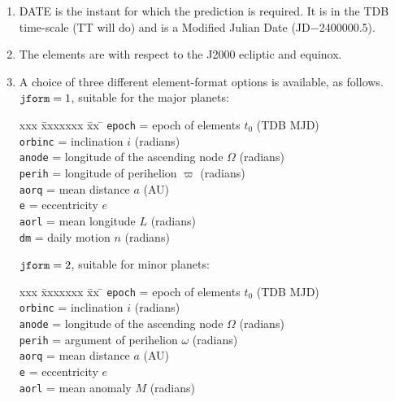 \documentclass[11pt,fleqn,twoside]{article}
\renewcommand{\_}{{\tt\char'137}}     %
\begin{document}
{
 \begin{enumerate}
  \item DATE is the instant for which the prediction is required.  It is
        in the TDB time-scale (TT will do) and is a
        Modified Julian Date (JD$-$2400000.5).
  \item The elements are with respect to the J2000 ecliptic and equinox.
  \item A choice of three different element-format options is available, as
        follows. \\
 
        ${\tt jform}=1$, suitable for the major planets:
 
        \begin{tabbing}
        xxx \= xxxxxxx \= xx \= \kill
        \> {\tt epoch}  \> = \> epoch of elements $t_0$ (TDB MJD) \\
        \> {\tt orbinc} \> = \> inclination $i$ (radians) \\
        \> {\tt anode}  \> = \> longitude of the ascending node $\Omega$ (radians) \\
        \> {\tt perih}  \> = \> longitude of perihelion $\varpi$ (radians) \\
        \> {\tt aorq}   \> = \> mean distance $a$ (AU) \\
        \> {\tt e}      \> = \> eccentricity $e$ \\
        \> {\tt aorl}   \> = \> mean longitude $L$ (radians) \\
        \> {\tt dm}     \> = \> daily motion $n$ (radians)
        \end{tabbing}
 
        ${\tt jform}=2$, suitable for minor planets:
 
        \begin{tabbing}
        xxx \= xxxxxxx \= xx \= \kill
        \> {\tt epoch}  \> = \> epoch of elements $t_0$ (TDB MJD) \\
        \> {\tt orbinc} \> = \> inclination $i$ (radians) \\
        \> {\tt anode}  \> = \> longitude of the ascending node $\Omega$ (radians) \\
        \> {\tt perih}  \> = \> argument of perihelion $\omega$ (radians) \\
        \> {\tt aorq}   \> = \> mean distance $a$ (AU) \\
        \> {\tt e}      \> = \> eccentricity $e$ \\
        \> {\tt aorl}   \> = \> mean anomaly $M$ (radians)
        \end{tabbing}
 

\end{enumerate}}
\end{document}
